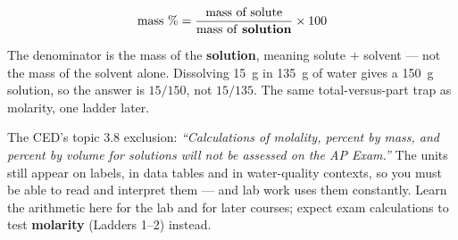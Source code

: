 \documentclass{apchem-worksheet}
\begin{document}
\begin{center}
\end{center}

\[ \text{mass \%} =
   \frac{\text{mass of solute}}{\text{mass of \textbf{solution}}}
   \times 100 \]

\begin{apctrap}
The denominator is the mass of the \textbf{solution}, meaning
solute $+$ solvent --- not the mass of the solvent alone. Dissolving
\SI{15}{\gram} in \SI{135}{\gram} of water gives a
\SI{150}{\gram} solution, so the answer is $15/150$, not $15/135$. The
same total-versus-part trap as molarity, one ladder later.
\end{apctrap}

\begin{apcnote}
The CED's topic 3.8 exclusion: \emph{``Calculations of molality,
percent by mass, and percent by volume for solutions will not be
assessed on the AP Exam.''} The units still appear on labels, in data
tables and in water-quality contexts, so you must be able to read and
interpret them --- and lab work uses them constantly. Learn the
arithmetic here for the lab and for later courses; expect exam
calculations to test \textbf{molarity} (Ladders 1--2) instead.
\end{apcnote}
\end{document}
